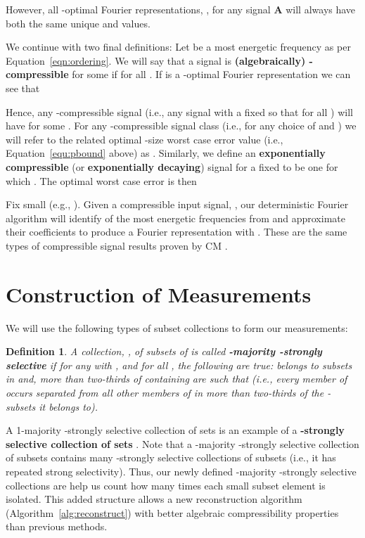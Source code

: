 \documentclass{article}
\begin{document}
However, all -optimal Fourier representations, , for any signal \textbf{A} will always have both the same unique  and  values.  

We continue with two final definitions:  Let  be a  most energetic frequency as per Equation~\ref{eqn:ordering}.  We will say that a signal  is \textbf{(algebraically) -compressible} for some  if  for all .  If  is a -optimal Fourier representation we can see that

Hence, any -compressible signal  (i.e., any signal with a fixed  so that  for all ) will have  for some .  For any -compressible signal class (i.e., for any choice of  and ) we will refer to the related optimal -size worst case error value (i.e., Equation~\ref{equ:pbound} above) as .  Similarly, we define an \textbf{exponentially compressible} (or \textbf{exponentially decaying}) signal for a fixed  to be one for which
.  The optimal worst case error is then


Fix  small (e.g., ).
Given a compressible input signal, , our deterministic Fourier algorithm will identify  of the most energetic frequencies from  and approximate their coefficients to produce a Fourier representation  with .  These are the same types of compressible signal results proven by CM \cite{CMDetCS1,CMDetCS2}.

\section{Construction of Measurements}
\label{sec:Measurements}

We will use the following types of subset collections to form our measurements:

\newtheorem{Definition}{Definition}
\begin{Definition}
A collection, , of  subsets of  is called \textbf{-majority -strongly selective} if for any  with , and for all , the following are true:    belongs to  subsets in  and,  more than two-thirds of  containing  are such that  (i.e., every member of  occurs separated from all other members of  in more than two-thirds of the  -subsets it belongs to).
\label{def:SepSets}
\end{Definition}

A 1-majority -strongly selective collection of sets is an example of a \textbf{-strongly selective collection of sets} \cite{Constructions,CMDetCS3}.  Note that a -majority -strongly selective collection of subsets contains many -strongly selective collections of subsets (i.e., it has repeated strong selectivity).  Thus, our newly defined -majority -strongly selective collections are help us count how many times each small subset element is isolated.  This added structure allows a new reconstruction algorithm (Algorithm~\ref{alg:reconstruct}) with better algebraic compressibility properties than previous methods.
\end{document}
